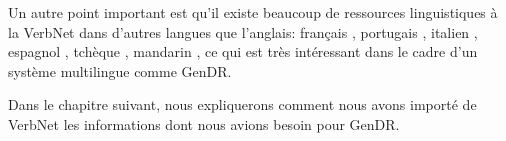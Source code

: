 Un autre point important est qu'il existe beaucoup de ressources linguistiques à la VerbNet dans d'autres langues que l'anglais: français \citep{DanlosVerbenetfrancais2016}, portugais \citep{ScartoncrosslinguisticVerbNetstylelexicon2012}, italien \citep{busso2016italian}, espagnol \citep{TauleAnCoraNetMappingSpanish2010}, tchèque \citep{pala2008can}, mandarin \citep{liu2008construction}, ce qui est très intéressant dans le cadre d'un système multilingue comme GenDR.

Dans le chapitre suivant, nous expliquerons comment nous avons importé de VerbNet les informations dont nous avions besoin pour GenDR.